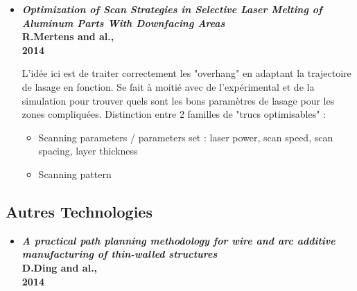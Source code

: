 \documentclass[11pt,a4paper]{article}
\begin{document}
\begin{itemize}
	
	\item \textbf{\emph{Optimization of Scan Strategies in Selective Laser Melting of Aluminum Parts With Downfacing Areas} \\
		R.Mertens and al., \\
		2014}
	
	\vspace{0cm}
	L'idée ici est de traiter correctement les "overhang" en adaptant la trajectoire de lasage en fonction. Se fait à moitié avec de l'expérimental et de la simulation pour trouver quels sont les bons paramètres de lasage pour les zones compliquées.
	Distinction entre 2 familles de "trucs optimisables" :
	\begin{itemize}
		\item Scanning parameters / parameters set : laser power, scan speed, scan spacing, layer thickness
		\item Scanning pattern 
	\end{itemize}
	
	
	
	
\end{itemize}

\subsection{Autres Technologies}

\begin{itemize}
	\item \textbf{\emph{A practical path planning methodology for wire and arc additive manufacturing of thin-walled structures} \\
		D.Ding and al., \\
		2014}

\end{itemize}
\end{document}
